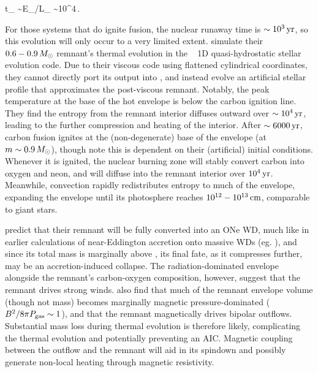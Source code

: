 \eqbegin
t_ \sim E_/L_ \sim 10^4\,.
\eqend

\noindent For those systems that do ignite fusion, the nuclear runaway time is $\sim10^3\,\mathrm{yr}$, so this evolution will only occur to a very limited extent.  \cite{shen+12} simulate their $0.6-0.9\,\Msun$ remnant's thermal evolution in the \mesa\ \citep{paxt+11} 1D quasi-hydrostatic stellar evolution code.  Due to their viscous code using flattened cylindrical coordinates, they cannot directly port its output into \mesa, and instead evolve an artificial stellar profile that approximates the post-viscous remnant.  Notably, the peak temperature at the base of the hot envelope is below the carbon ignition line.  They find the entropy from the remnant interior diffuses outward over $\sim10^4\,\mathrm{yr}$, leading to the further compression and heating of the interior.  After $\sim6000\,\mathrm{yr}$, carbon fusion ignites at the (non-degenerate) base of the envelope (at $m \sim 0.9\,\Msun$), though \cite{shen+12} note this is dependent on their (artificial) initial conditions.  Whenever it is ignited, the nuclear burning zone will stably convert carbon into oxygen and neon, and will diffuse into the remnant interior over $10^4\,\mathrm{yr}$.  Meanwhile, convection rapidly redistributes entropy to much of the envelope, expanding the envelope until its photosphere reaches $10^{12}-10^{13}\,\mathrm{cm}$, comparable to giant stars.  

\cite{shen+12} predict that their remnant will be fully converted into an ONe WD, much like in earlier calculations of near-Eddington accretion onto massive WDs (eg. \citeal{saion85}), and since its total mass is marginally above \Mch, its final fate, as it compresses further, may be an accretion-induced collapse.  The radiation-dominated envelope alongside the remnant's carbon-oxygen composition, however, suggest that the remnant drives strong winds.  \cite{ji+13} also find that much of the remnant envelope volume (though not mass) becomes marginally magnetic pressure-dominated ($B^2/8\pi P_\mathrm{gas} \sim 1$), and that the remnant magnetically drives bipolar outflows.  Substantial mass loss during thermal evolution is therefore likely, complicating the thermal evolution and potentially preventing an AIC.  Magnetic coupling between the outflow and the remnant will aid in its spindown and possibly generate non-local heating through magnetic resistivity.


